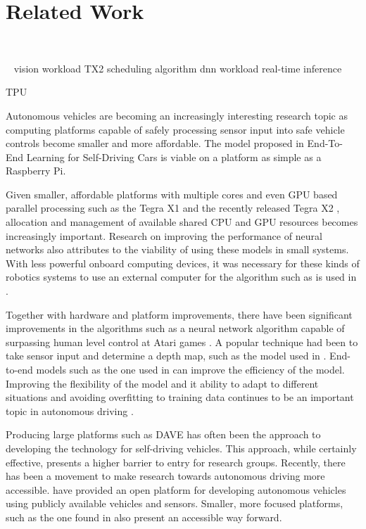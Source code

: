 \section{Related Work}\label{sec:related}

\cite{Bojarski2016}

\cite{Kato:2015}
~\cite{shin2017project}
~\cite{upennf1tenth}

~\cite{Otterness2017} vision workload
\cite{Amert2017} TX2 scheduling algorithm
\cite{NVIDIA2015} dnn workload real-time inference

\cite{Jouppi2017} TPU

Autonomous vehicles are becoming an increasingly interesting research
topic as computing platforms capable of safely processing sensor input
into safe vehicle controls become smaller and more affordable.  The
model proposed in End-To-End Learning for Self-Driving Cars
\cite{Bojarski2016} is viable on a platform as simple as a Raspberry
Pi. 

Given smaller, affordable platforms with multiple cores and even GPU
based parallel processing such as the Tegra X1 \cite{NVIDIA2015} and
the recently released Tegra X2 \cite{Amert2017}, allocation and
management of available shared CPU and GPU resources \cite{Kim2016}
becomes increasingly important.  Research on improving the performance
of neural networks \cite{Jouppi2017} also attributes to the viability
of using these models in small systems.  With less powerful onboard
computing devices, it was necessary for these kinds of robotics
systems to use an external computer for the algorithm such as is used
in \cite{LeCun:2005}. 

Together with hardware and platform improvements, there have been
significant improvements in the algorithms such as a neural network
algorithm capable of surpassing human level control at Atari games
\cite{DBLP}.  A popular technique had been to take sensor input and
determine a depth map, such as the model used in
\cite{Michels:2005}. End-to-end models such as the one used in
\cite{Bojarski2016} can improve the efficiency of the model.
Improving the flexibility of the model and it ability to adapt to
different situations and avoiding overfitting to training data
continues to be an important topic in autonomous driving
\cite{Pomerleau1989}. 

Producing large platforms such as DAVE \cite{LeCun:04} has often been
the approach to developing the technology for self-driving vehicles.
This approach, while certainly effective, presents a higher barrier to
entry for research groups.  Recently, there has been a movement to
make research towards autonomous driving more accessible.
\cite{Kato:2015} have provided an open platform for developing
autonomous vehicles using publicly available vehicles and sensors.
Smaller, more focused platforms, such as the one found in
\cite{Michels:2005} also present an accessible way forward. 
